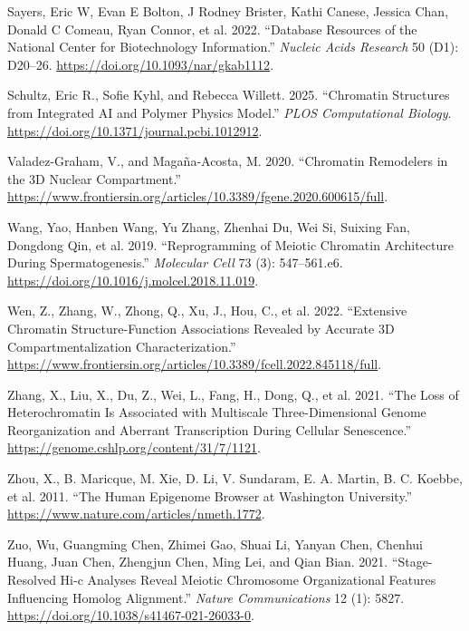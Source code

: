 \documentclass[
  a4paper,
  openany]{scrbook}
\newlength{\cslhangindent}
\newenvironment{CSLReferences}[2] %
 {\begin{list}{}{%
  \setlength{\itemindent}{0pt}
  \setlength{\leftmargin}{0pt}
  \setlength{\parsep}{0pt}
  \ifodd #1
   \setlength{\leftmargin}{\cslhangindent}
   \setlength{\itemindent}{-1\cslhangindent}
  \fi
  \setlength{\itemsep}{#2\baselineskip}}}
 {\end{list}}
\begin{document}
\begin{CSLReferences}{1}{0}
Sayers, Eric W, Evan E Bolton, J Rodney Brister, Kathi Canese, Jessica
Chan, Donald C Comeau, Ryan Connor, et al. 2022. {``Database Resources
of the National Center for Biotechnology Information.''} \emph{Nucleic
Acids Research} 50 (D1): D20--26.
\url{https://doi.org/10.1093/nar/gkab1112}.

Schultz, Eric R., Sofie Kyhl, and Rebecca Willett. 2025. {``Chromatin
Structures from Integrated AI and Polymer Physics Model.''} \emph{PLOS
Computational Biology}.
\url{https://doi.org/10.1371/journal.pcbi.1012912}.

Valadez-Graham, V., and Magaña-Acosta, M. 2020. {``Chromatin Remodelers
in the 3D Nuclear Compartment.''}
\url{https://www.frontiersin.org/articles/10.3389/fgene.2020.600615/full}.

Wang, Yao, Hanben Wang, Yu Zhang, Zhenhai Du, Wei Si, Suixing Fan,
Dongdong Qin, et al. 2019. {``Reprogramming of Meiotic Chromatin
Architecture During Spermatogenesis.''} \emph{Molecular Cell} 73 (3):
547--561.e6. \url{https://doi.org/10.1016/j.molcel.2018.11.019}.

Wen, Z., Zhang, W., Zhong, Q., Xu, J., Hou, C., et al. 2022.
{``Extensive Chromatin Structure-Function Associations Revealed by
Accurate 3D Compartmentalization Characterization.''}
\url{https://www.frontiersin.org/articles/10.3389/fcell.2022.845118/full}.

Zhang, X., Liu, X., Du, Z., Wei, L., Fang, H., Dong, Q., et al. 2021.
{``The Loss of Heterochromatin Is Associated with Multiscale
Three-Dimensional Genome Reorganization and Aberrant Transcription
During Cellular Senescence.''}
\url{https://genome.cshlp.org/content/31/7/1121}.

Zhou, X., B. Maricque, M. Xie, D. Li, V. Sundaram, E. A. Martin, B. C.
Koebbe, et al. 2011. {``The Human Epigenome Browser at Washington
University.''} \url{https://www.nature.com/articles/nmeth.1772}.

Zuo, Wu, Guangming Chen, Zhimei Gao, Shuai Li, Yanyan Chen, Chenhui
Huang, Juan Chen, Zhengjun Chen, Ming Lei, and Qian Bian. 2021.
{``Stage-Resolved Hi-c Analyses Reveal Meiotic Chromosome Organizational
Features Influencing Homolog Alignment.''} \emph{Nature Communications}
12 (1): 5827. \url{https://doi.org/10.1038/s41467-021-26033-0}.

\end{CSLReferences}


\backmatter
\end{document}
